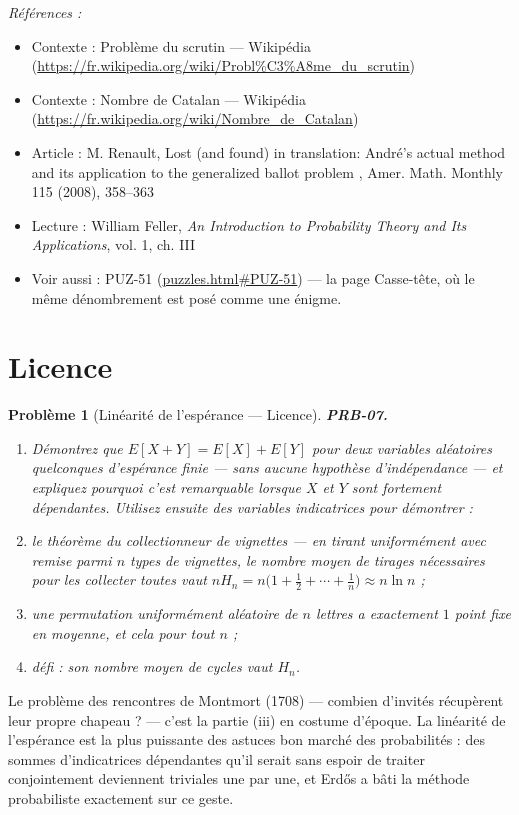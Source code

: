 \documentclass[11pt]{article}
\newtheorem{problem}{Problème}
\newenvironment{refs}{\par\small\noindent\emph{Références :}\begin{itemize}\setlength\itemsep{0pt}}{\end{itemize}\normalsize}
\begin{document}
\begin{refs}
\item Contexte : Problème du scrutin --- Wikipédia (\url{https://fr.wikipedia.org/wiki/Probl%C3%A8me_du_scrutin})
\item Contexte : Nombre de Catalan --- Wikipédia (\url{https://fr.wikipedia.org/wiki/Nombre_de_Catalan})
\item Article : M. Renault, \og{} Lost (and found) in translation: André's actual method and its application to the generalized ballot problem \fg{}, Amer. Math. Monthly 115 (2008), 358--363
\item Lecture : William Feller, \textit{An Introduction to Probability Theory and Its Applications}, vol. 1, ch. III
\item Voir aussi : PUZ-51 (\url{puzzles.html#PUZ-51}) --- la page Casse-tête, où le même dénombrement est posé comme une énigme.
\end{refs}

\bigskip


\section*{Licence}

\begin{problem}[{Linéarité de l'espérance --- Licence}]
\textbf{PRB-07.} \begin{enumerate}
\item[(i)] Démontrez que $ E[X+Y] = E[X] + E[Y] $ pour deux variables aléatoires quelconques
d'espérance finie --- sans aucune hypothèse d'indépendance --- et expliquez pourquoi c'est remarquable
lorsque $ X $ et $ Y $ sont fortement dépendantes. Utilisez ensuite des variables indicatrices
pour démontrer :
\item[(ii)] le théorème du collectionneur de vignettes --- en tirant uniformément avec remise parmi $ n $
types de vignettes, le nombre moyen de tirages nécessaires pour les collecter toutes vaut
$ n H_n = n\big(1 + \frac12 + \cdots + \frac1n\big) \approx n\ln n $ ;
\item[(iii)] une permutation uniformément aléatoire de $ n $ lettres a exactement $ 1 $ point fixe en
moyenne, et cela pour tout $ n $ ;
\item[(iv)] défi : son nombre moyen de cycles vaut $ H_n $.
\end{enumerate}

\end{problem}

\noindent Le problème des rencontres de Montmort (1708) --- combien d'invités récupèrent
leur propre chapeau ? --- c'est la partie (iii) en costume d'époque. La linéarité de l'espérance est
la plus puissante des astuces bon marché des probabilités : des sommes d'indicatrices dépendantes
qu'il serait sans espoir de traiter conjointement deviennent triviales une par une, et Erd\H{o}s a
bâti la méthode probabiliste exactement sur ce geste.
\end{document}
